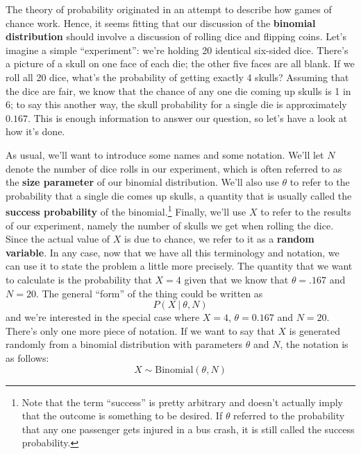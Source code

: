 \documentclass[
  11pt,
  a4paper,
  twoside,symmetric,openright]{book}
\theoremstyle{break}
\theoremstyle{break}
\begin{document}
The theory of probability originated in an attempt to describe how games of chance work. Hence, it seems fitting that our discussion of the \textbf{binomial distribution} should involve a discussion of rolling dice and flipping coins. Let's imagine a simple ``experiment'': we're holding 20 identical six-sided dice. There's a picture of a skull on one face of each die; the other five faces are all blank. If we roll all 20 dice, what's the probability of getting exactly 4 skulls? Assuming that the dice are fair, we know that the chance of any one die coming up skulls is 1 in 6; to say this another way, the skull probability for a single die is approximately \(0.167\). This is enough information to answer our question, so let's have a look at how it's done.

As usual, we'll want to introduce some names and some notation. We'll let \(N\) denote the number of dice rolls in our experiment, which is often referred to as the \textbf{size parameter} of our binomial distribution. We'll also use \(\theta\) to refer to the probability that a single die comes up skulls, a quantity that is usually called the \textbf{success probability} of the binomial.\footnote{Note that the term ``success'' is pretty arbitrary and doesn't actually imply that the outcome is something to be desired. If \(\theta\) referred to the probability that any one passenger gets injured in a bus crash, it is still called the success probability.} Finally, we'll use \(X\) to refer to the results of our experiment, namely the number of skulls we get when rolling the dice. Since the actual value of \(X\) is due to chance, we refer to it as a \textbf{random variable}. In any case, now that we have all this terminology and notation, we can use it to state the problem a little more precisely. The quantity that we want to calculate is the probability that \(X = 4\) given that we know that \(\theta = .167\) and \(N=20\). The general ``form'' of the thing could be written as
\[
P(X \ | \ \theta, N)
\]
and we're interested in the special case where \(X=4\), \(\theta = 0.167\) and \(N=20\).
There's only one more piece of notation. If we want to say that \(X\) is generated randomly from a binomial distribution with parameters \(\theta\) and \(N\), the notation is as follows:
\[
X \sim \mbox{Binomial}(\theta, N)
\]
\end{document}
